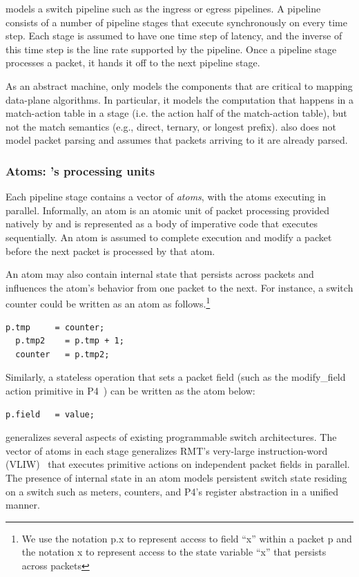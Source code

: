 \absmachine models a switch pipeline such as the ingress or egress pipelines. A
pipeline consists of a number of pipeline stages that execute synchronously on
every time step. Each stage is assumed to have one time step of latency, and
the inverse of this time step is the line rate supported by the pipeline. Once
a pipeline stage processes a packet, it hands it off to the next pipeline
stage.

As an abstract machine, \absmachine only models the components that are
critical to mapping data-plane algorithms. In particular, it models the
computation that happens in a match-action table in a stage (i.e. the action
half of the match-action table), but not the match semantics (e.g., direct,
ternary, or longest prefix). \absmachine also does not model packet parsing and
assumes that packets arriving to it are already parsed.

\subsubsection{Atoms: \absmachine's processing units}

Each pipeline stage contains a vector of \textit{atoms}, with the atoms
executing in parallel. Informally, an atom is an atomic unit of packet
processing provided natively by \absmachine and is represented as a body of
imperative code that executes sequentially. An atom is assumed to complete
execution and modify a packet before the next packet is processed by that atom.

An atom may also contain internal state that persists across packets and
influences the atom's behavior from one packet to the next. For instance, a
switch counter could be written as an atom as follows.\footnote{We use the
  notation p.x to represent access to field ``x'' within a packet p and the
  notation x to represent access to the state variable ``x'' that persists across packets}
  \begin{lstlisting}[style=customc]
  p.tmp     = counter;
  p.tmp2    = p.tmp + 1;
  counter   = p.tmp2;
  \end{lstlisting}
Similarly, a stateless operation that sets a packet field (such as the
modify\_field action primitive in P4~\cite{p4spec}) can be written as the atom
below:
\begin{lstlisting}[style=customc]
p.field   = value;
\end{lstlisting}

\absmachine generalizes several aspects of existing programmable switch
architectures. The vector of atoms in each stage generalizes RMT's very-large
instruction-word (VLIW)~\cite{rmt} that executes primitive actions on
independent packet fields in parallel. The presence of internal state in an
atom models persistent switch state residing on a switch such as meters,
counters, and P4's register abstraction in a unified manner.

